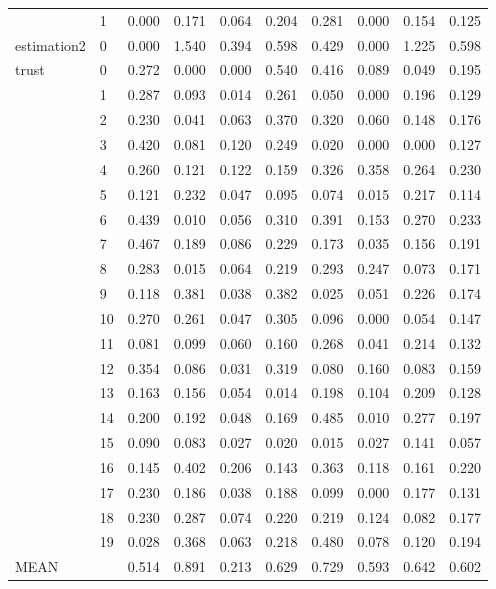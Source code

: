 \begin{table}
\begin{tabular}{llrrrrrrrr}
 & 1 & 0.000 & 0.171 & 0.064 & 0.204 & 0.281 & 0.000 & 0.154 & 0.125 \\
\cline{1-10}
estimation2 & 0 & 0.000 & 1.540 & 0.394 & 0.598 & 0.429 & 0.000 & 1.225 & 0.598 \\
\cline{1-10}
\multirow[t]{20}{*}{trust} & 0 & 0.272 & 0.000 & 0.000 & 0.540 & 0.416 & 0.089 & 0.049 & 0.195 \\
 & 1 & 0.287 & 0.093 & 0.014 & 0.261 & 0.050 & 0.000 & 0.196 & 0.129 \\
 & 2 & 0.230 & 0.041 & 0.063 & 0.370 & 0.320 & 0.060 & 0.148 & 0.176 \\
 & 3 & 0.420 & 0.081 & 0.120 & 0.249 & 0.020 & 0.000 & 0.000 & 0.127 \\
 & 4 & 0.260 & 0.121 & 0.122 & 0.159 & 0.326 & 0.358 & 0.264 & 0.230 \\
 & 5 & 0.121 & 0.232 & 0.047 & 0.095 & 0.074 & 0.015 & 0.217 & 0.114 \\
 & 6 & 0.439 & 0.010 & 0.056 & 0.310 & 0.391 & 0.153 & 0.270 & 0.233 \\
 & 7 & 0.467 & 0.189 & 0.086 & 0.229 & 0.173 & 0.035 & 0.156 & 0.191 \\
 & 8 & 0.283 & 0.015 & 0.064 & 0.219 & 0.293 & 0.247 & 0.073 & 0.171 \\
 & 9 & 0.118 & 0.381 & 0.038 & 0.382 & 0.025 & 0.051 & 0.226 & 0.174 \\
 & 10 & 0.270 & 0.261 & 0.047 & 0.305 & 0.096 & 0.000 & 0.054 & 0.147 \\
 & 11 & 0.081 & 0.099 & 0.060 & 0.160 & 0.268 & 0.041 & 0.214 & 0.132 \\
 & 12 & 0.354 & 0.086 & 0.031 & 0.319 & 0.080 & 0.160 & 0.083 & 0.159 \\
 & 13 & 0.163 & 0.156 & 0.054 & 0.014 & 0.198 & 0.104 & 0.209 & 0.128 \\
 & 14 & 0.200 & 0.192 & 0.048 & 0.169 & 0.485 & 0.010 & 0.277 & 0.197 \\
 & 15 & 0.090 & 0.083 & 0.027 & 0.020 & 0.015 & 0.027 & 0.141 & 0.057 \\
 & 16 & 0.145 & 0.402 & 0.206 & 0.143 & 0.363 & 0.118 & 0.161 & 0.220 \\
 & 17 & 0.230 & 0.186 & 0.038 & 0.188 & 0.099 & 0.000 & 0.177 & 0.131 \\
 & 18 & 0.230 & 0.287 & 0.074 & 0.220 & 0.219 & 0.124 & 0.082 & 0.177 \\
 & 19 & 0.028 & 0.368 & 0.063 & 0.218 & 0.480 & 0.078 & 0.120 & 0.194 \\
\cline{1-10}
MEAN &  & 0.514 & 0.891 & 0.213 & 0.629 & 0.729 & 0.593 & 0.642 & 0.602 \\
\cline{1-10}
\bottomrule
\end{tabular}
\end{table}

